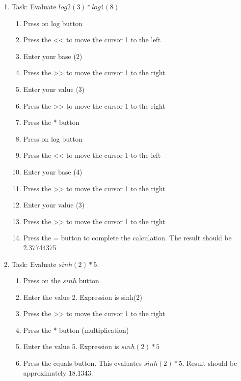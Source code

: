 \begin{enumerate}
            \item Task: Evaluate $log2(3) * log4(8)$
                \begin{enumerate}
                	\item Press on log button
                	\item Press the << to move the cursor 1 to the left
                	\item Enter your base (2)
                	\item Press the >> to move the cursor 1 to the right
                	\item Enter your value (3)
                	\item Press the >> to move the cursor 1 to the right
                	\item Press the * button
                	\item Press on log button
                	\item Press the << to move the cursor 1 to the left
                	\item Enter your base (4)
                	\item Press the >> to move the cursor 1 to the right
                	\item Enter your value (3)
                	\item Press the >> to move the cursor 1 to the right
                    \item Press the = button to complete the calculation. The result should be 2.37744375
                \end{enumerate}

            \newpage
            \item Task: Evaluate $sinh(2)*5$.
                \begin{enumerate}
                    \item Press on the $sinh$ button
                    \item Enter the value 2. Expression is sinh(2)
                	\item Press the >> to move the cursor 1 to the right
                    \item Press the * button (multiplication)
                    \item Enter the value 5. Expression is $sinh(2)*5$
                    \item Press the equals button. This evaluates  $sinh(2)*5$. Result should be approximately 18.1343.
                \end{enumerate}


\end{enumerate}

